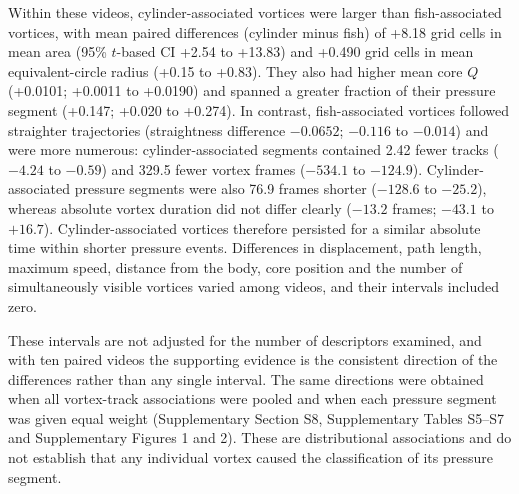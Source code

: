 \documentclass[openacc]{rsproca_new}
\begin{document}
Within these videos, cylinder-associated vortices were larger than fish-associated vortices, with mean paired differences (cylinder minus fish) of +8.18 grid cells in mean area (95\% $t$-based CI +2.54 to +13.83) and +0.490 grid cells in mean equivalent-circle radius (+0.15 to +0.83). They also had higher mean core $Q$ (+0.0101; +0.0011 to +0.0190) and spanned a greater fraction of their pressure segment (+0.147; +0.020 to +0.274). In contrast, fish-associated vortices followed straighter trajectories (straightness difference $-0.0652$; $-0.116$ to $-0.014$) and were more numerous: cylinder-associated segments contained 2.42 fewer tracks ($-4.24$ to $-0.59$) and 329.5 fewer vortex frames ($-534.1$ to $-124.9$). Cylinder-associated pressure segments were also 76.9 frames shorter ($-128.6$ to $-25.2$), whereas absolute vortex duration did not differ clearly ($-13.2$ frames; $-43.1$ to $+16.7$). Cylinder-associated vortices therefore persisted for a similar absolute time within shorter pressure events. Differences in displacement, path length, maximum speed, distance from the body, core position and the number of simultaneously visible vortices varied among videos, and their intervals included zero.

These intervals are not adjusted for the number of descriptors examined, and with ten paired videos the supporting evidence is the consistent direction of the differences rather than any single interval. The same directions were obtained when all vortex-track associations were pooled and when each pressure segment was given equal weight (Supplementary Section S8, Supplementary Tables S5--S7 and Supplementary Figures 1 and 2). These are distributional associations and do not establish that any individual vortex caused the classification of its pressure segment.
\end{document}
